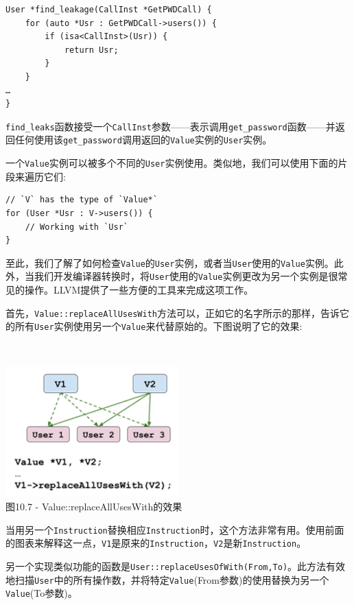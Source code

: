 \begin{lstlisting}[style=styleCXX]
User *find_leakage(CallInst *GetPWDCall) {
	for (auto *Usr : GetPWDCall->users()) {
		if (isa<CallInst>(Usr)) {
			return Usr;
		}
	}
…
}
\end{lstlisting}

\texttt{find\_leaks}函数接受一个\texttt{CallInst}参数——表示调用\texttt{get\_password}函数——并返回任何使用该\texttt{get\_password}调用返回的\texttt{Value}实例的\texttt{User}实例。

一个\texttt{Value}实例可以被多个不同的\texttt{User}实例使用。类似地，我们可以使用下面的片段来遍历它们:

\begin{lstlisting}[style=styleCXX]
// `V` has the type of `Value*`
for (User *Usr : V->users()) {
	// Working with `Usr`
}
\end{lstlisting}

至此，我们了解了如何检查\texttt{Value}的\texttt{User}实例，或者当\texttt{User}使用的\texttt{Value}实例。此外，当我们开发编译器转换时，将\texttt{User}使用的\texttt{Value}实例更改为另一个实例是很常见的操作。LLVM提供了一些方便的工具来完成这项工作。

首先，\texttt{Value::replaceAllUsesWith}方法可以，正如它的名字所示的那样，告诉它的所有\texttt{User}实例使用另一个\texttt{Value}来代替原始的。下图说明了它的效果:

\hspace*{\fill} \\ %
\begin{center}
\includegraphics[width=0.5\textwidth]{content/3/chapter10/images/7.png}\\
图10.7 - Value::replaceAllUsesWith的效果
\end{center}

当用另一个\texttt{Instruction}替换相应\texttt{Instruction}时，这个方法非常有用。使用前面的图表来解释这一点，\texttt{V1}是原来的\texttt{Instruction}，\texttt{V2}是新\texttt{Instruction}。

另一个实现类似功能的函数是\texttt{User::replaceUsesOfWith(From,To)}。此方法有效地扫描\texttt{User}中的所有操作数，并将特定\texttt{Value}(From参数)的使用替换为另一个\texttt{Value}(To参数)。

